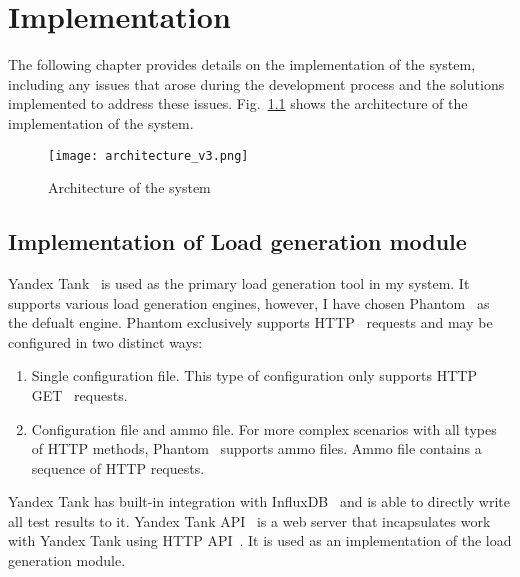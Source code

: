 \chapter{Implementation}
\label{ch:impl}


\newcommand{\code}[1]{\colorbox{light-gray}{\texttt{#1}}}
\lstset{style=mystyle}


The following chapter provides details on the implementation of the system, including any issues that arose during the development process and the solutions implemented to address these issues.
Fig.~\ref{fig:architecture} shows the architecture of the implementation of the system.

\begin{figure}[t]
    \centering
    \texttt{[image: architecture\_v3.png]}
    \caption{Architecture of the system}
    \label{fig:architecture}
\end{figure}

\section{Implementation of Load generation module}\label{sec:yandex_tank_use}
Yandex Tank~\cite{yandex_tank} is used as the primary load generation tool in my system. It supports various load generation engines, however, I have chosen Phantom~\cite{phantom} as the defualt engine. Phantom exclusively supports HTTP~\cite{http} requests and may be configured in two distinct ways:
\begin{enumerate}
    \item Single configuration file. This type of configuration only supports HTTP GET~\cite{http} requests.
    \item Configuration file and ammo file. For more complex scenarios with all types of HTTP methods, Phantom~\cite{phantom} supports ammo files. Ammo file contains a sequence of HTTP requests.
\end{enumerate}
Yandex Tank has built-in integration with InfluxDB~\cite{influxdb} and is able to directly write all test results to it.
Yandex Tank API~\cite{yandex_tank_api} is a web server that incapsulates work with Yandex Tank using HTTP API~\cite{microservices}. It is used as an implementation of the load generation module.


